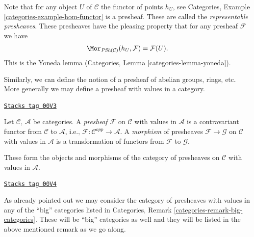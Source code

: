 Note that for any object $U$ of $\mathcal{C}$ the functor of
points $h_U$, see Categories, Example \ref{categories-example-hom-functor}
is a presheaf. These are called the {\it representable presheaves}.
These presheaves have the pleasing property that for any
presheaf $\mathcal{F}$ we have
\begin{equation}
\label{equation-map-representable-into-presheaf}
\Mor_{\textit{PSh}(\mathcal{C})}(h_U, \mathcal{F})
=
\mathcal{F}(U).
\end{equation}
This is the Yoneda lemma (Categories, Lemma \ref{categories-lemma-yoneda}).

\medskip\noindent
Similarly, we can define the notion of a presheaf of abelian groups,
rings, etc. More generally we may define a presheaf with values in a
category.

\begin{definition}[Presheaf]
\label{sites-definition-presheaf}
\href{https://stacks.math.columbia.edu/tag/00V3}{\texttt{Stacks tag 00V3}}

Let $\mathcal{C}$, $\mathcal{A}$ be categories.
A {\it presheaf} $\mathcal{F}$ on $\mathcal{C}$
with values in $\mathcal{A}$ is a contravariant
functor from $\mathcal{C}$ to $\mathcal{A}$,
i.e., $\mathcal{F} : \mathcal{C}^{opp} \to \mathcal{A}$.
A {\it morphism} of presheaves $\mathcal{F} \to \mathcal{G}$
on $\mathcal{C}$ with values in $\mathcal{A}$ is a transformation
of functors from $\mathcal{F}$ to $\mathcal{G}$.
\end{definition}

These form the objects and morphisms of the category of presheaves
on $\mathcal{C}$ with values in $\mathcal{A}$.

\begin{remark}
\label{sites-remark-big-presheaves}
\href{https://stacks.math.columbia.edu/tag/00V4}{\texttt{Stacks tag 00V4}}

As already pointed out we may consider the category of
presheaves with values in any of the ``big'' categories
listed in Categories, Remark \ref{categories-remark-big-categories}.
These will be ``big'' categories as well and they will be
listed in the above mentioned remark as we go along.
\end{remark}

